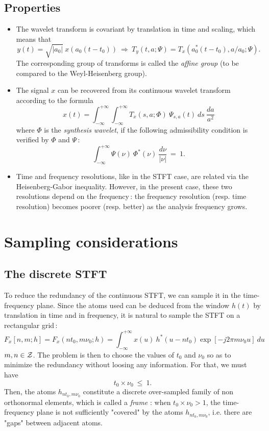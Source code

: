 \subsection{Properties}
\label{affinegroup}
\begin{itemize}
\item The wavelet transform is covariant by translation in time and scaling,
which means that
\[ y(t) = \sqrt{|a_0|}\ x(a_0(t-t_0)) \ \Rightarrow\  T_y(t,a;\Psi) =
T_x(a_0^*(t-t_0),a/a_0;\Psi).\] 
The corresponding group of transforms is called the {\it affine group} (to
be compared to the Weyl-Heisenberg group).
  
\item The signal $x$ can be recovered from its continuous wavelet transform
according to the formula
\[x(t) = \int_{-\infty}^{+\infty}\int_{-\infty}^{+\infty} T_x(s,a;\Phi)\
\Psi_{s,a}(t)\ ds\ \frac{da}{a^2}\] 
where $\Phi$ is the {\it synthesis wavelet}, if the following admissibility
condition is verified by $\Phi$ and $\Psi$\,:
\[\int_{-\infty}^{+\infty} \Psi(\nu)\ \Phi^*(\nu)\ \frac{d\nu}{|\nu|}\ =\
1.\] 
 
\item Time and frequency resolutions, like in the STFT case, are related via
the Heisenberg-Gabor inequality. However, in the present case, these two
resolutions depend on the frequency\,: the frequency resolution (resp. time
resolution) becomes poorer (resp. better) as the analysis frequency grows.
\end{itemize}

\section{Sampling considerations}
\subsection{The discrete STFT}
  To reduce the redundancy of the continuous STFT, we can sample it in the
time-frequency plane. Since the atoms used can be deduced from the window
$h(t)$ by translation in time and in frequency, it is natural to sample the
STFT on a rectangular grid\,:
\[F_x[n,m;h]=F_x(nt_0,m\nu_0;h)=\int_{-\infty}^{+\infty} x(u)\
h^*(u-nt_0) \exp{[-j2\pi m \nu_0 u]}\ du \]
$m,n \in {\cal Z}$. The problem is then to choose the values of $t_0$ and $\nu_0$
so as to minimize the redundancy without loosing any information. For that,
we must have
\[t_0\times \nu_0\ \leq\ 1.\]
Then, the atoms ${h_{nt_0,m\nu_0}}$ constitute a discrete over-sampled
family of non orthonormal elements, which is called a {\it frame} : when
$t_0\times \nu_0>1$, the time-frequency plane is not sufficiently "covered" by
the atoms $h_{nt_0,m\nu_0}$, i.e.  there are "gaps" between adjacent
atoms.

